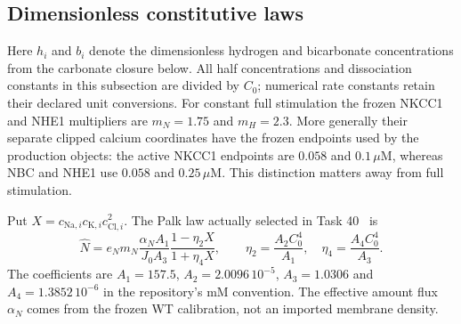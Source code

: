 \subsection{Dimensionless constitutive laws}
Here $h_i$ and $b_i$ denote the dimensionless hydrogen and bicarbonate
concentrations from the carbonate closure below.  All half concentrations
and dissociation constants in this subsection are divided by $C_0$;
numerical rate constants retain their declared unit conversions.
For constant full stimulation the frozen NKCC1 and NHE1 multipliers are
$m_N=1.75$ and $m_H=2.3$.  More generally their separate clipped calcium
coordinates have the frozen endpoints used by the production objects:
the active NKCC1 endpoints are $0.058$ and $0.1\,\mu\mathrm M$,
whereas NBC and NHE1 use $0.058$ and $0.25\,\mu\mathrm M$.
This distinction matters away from full stimulation.

Put $X=c_{\mathrm{Na},i}c_{\mathrm K,i}c_{\mathrm{Cl},i}^{2}$.  The
Palk law actually selected in Task 40~\cite{m44Palk2010} is
\begin{equation}
 \widehat N=e_Nm_N\frac{\alpha_N A_1}{J_0A_3}
   \frac{1-\eta_2X}{1+\eta_4X},\qquad
 \eta_2=\frac{A_2C_0^4}{A_1},\quad
 \eta_4=\frac{A_4C_0^4}{A_3}.
 \label{m44eq:dimless-nkcc}
\end{equation}
The coefficients are $A_1=157.5$, $A_2=2.0096\,10^{-5}$,
$A_3=1.0306$ and $A_4=1.3852\,10^{-6}$ in the repository's mM
convention.  The effective amount flux $\alpha_N$ comes from the frozen
WT calibration, not an imported membrane density.

